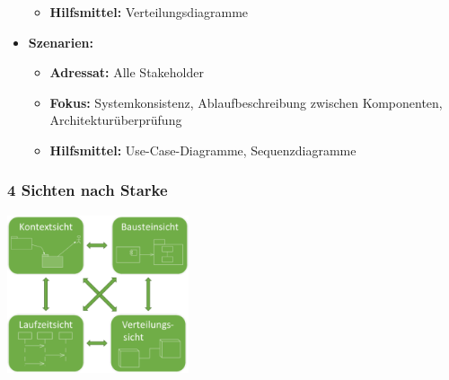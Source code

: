 \documentclass[11pt, a4paper]{article}
\begin{document}
\begin{itemize}
\begin{itemize}
        \item \textbf{Hilfsmittel:} Verteilungsdiagramme
    \end{itemize}
    \item \textbf{Szenarien:}
    \begin{itemize}
        \item \textbf{Adressat:} Alle Stakeholder
        \item \textbf{Fokus:} Systemkonsistenz, Ablaufbeschreibung zwischen Komponenten, Architekturüberprüfung
        \item \textbf{Hilfsmittel:} Use-Case-Diagramme, Sequenzdiagramme
    \end{itemize}
\end{itemize}

\newpage


\raggedright \subsubsection{4 Sichten nach Starke}

\centering \includegraphics[width=0.4\textwidth]{Starke-00.png}
\end{document}
